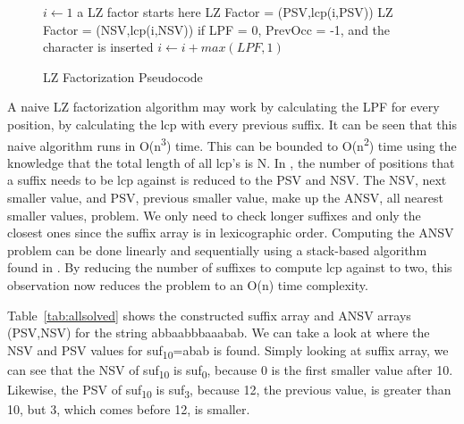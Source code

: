 \begin{figure}
\begin{algorithmic}[1]
\State $i \gets 1$
\State a LZ factor starts here
\State LZ Factor = (PSV,lcp(i,PSV))
\Else
\State LZ Factor = (NSV,lcp(i,NSV))
\EndIf
\State if LPF = 0, PrevOcc = -1, and the character is inserted
\State $i \gets i + max(LPF,1)$\EndWhile
\EndProcedure
\end{algorithmic}
\caption{LZ Factorization Pseudocode}
\label{algorithm:lzfactorization}
\end{figure}

A naive LZ factorization algorithm may work by calculating the LPF for every position, by calculating the lcp with every previous suffix.
It can be seen that this naive algorithm runs in O(n\textsuperscript{3}) time.
This can be bounded to O(n\textsuperscript{2}) time using the knowledge that the total length of all lcp's is N.
In \cite{crochemore2008computing}, the number of positions that a suffix needs to be lcp against is reduced to the PSV and NSV.
The NSV, next smaller value, and PSV, previous smaller value, make up the ANSV, all nearest smaller values, problem.
We only need to check longer suffixes and only the closest ones since the suffix array is in lexicographic order.
Computing the ANSV problem can be done linearly and sequentially using a stack-based algorithm found in \cite{gabow1984scaling}.
By reducing the number of suffixes to compute lcp against to two, this observation now reduces the problem to an O(n) time complexity.

Table~\ref{tab:allsolved} shows the constructed suffix array and ANSV arrays (PSV,NSV) for the string abbaabbbaaabab.
We can take a look at where the NSV and PSV values for suf\textsubscript{10}=abab is found.
Simply looking at suffix array, we can see that the NSV of suf\textsubscript{10} is suf\textsubscript{0}, because 0 is the first smaller value after 10.
Likewise, the PSV of suf\textsubscript{10} is suf\textsubscript{3}, because 12, the previous value, is greater than 10, but 3, which comes before 12, is smaller.

